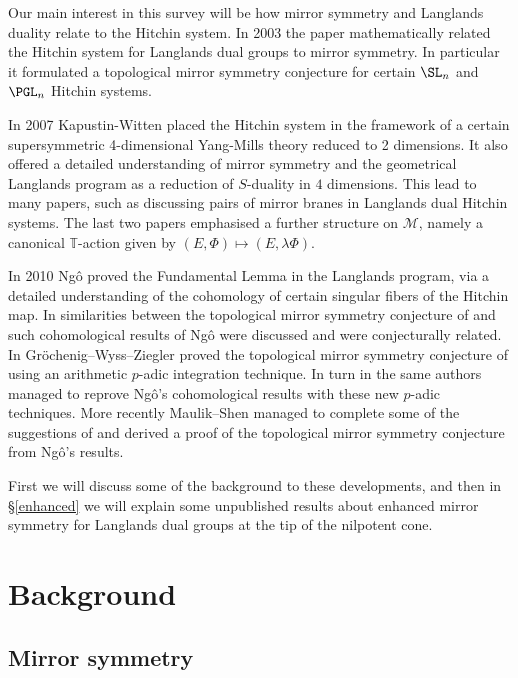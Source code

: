 \documentclass[12pt]{article}
\numberwithin{equation}{section}
\theoremstyle{remark}
\numberwithin{theorem}{section}
\def\M{{\mathcal{M}}}
\newcommand{\T}{{\mathbb{T}}}
\numberwithin{equation}{section}
\begin{document}
Our main interest in this survey will be  how mirror symmetry and Langlands duality relate to the Hitchin system. 
In 2003 the paper \cite{hausel-thaddeus} mathematically related the Hitchin system for Langlands dual groups to mirror symmetry. In particular it formulated a topological mirror symmetry conjecture for certain $\SL_n$ and $\PGL_n$ Hitchin systems. 

In 2007 Kapustin-Witten \cite{kapustin-witten} placed the Hitchin system in the framework of a certain supersymmetric 4-dimensional Yang-Mills theory reduced to  2 dimensions. It also offered a detailed understanding of mirror symmetry and the geometrical Langlands program as a reduction of $S$-duality in $4$ dimensions. 
This lead to many papers, such as \cite{baraglia-schaposnik, garcia-prada-etal, hitchin-characteristic,hausel-mellit-pei, hausel-hitchin} discussing pairs of mirror branes in Langlands dual Hitchin systems. The last two papers emphasised a further structure on $\M$, namely a canonical $\T$-action given by $(E,\Phi)\mapsto (E,\lambda\Phi)$. 

In 2010 Ng\^{o} \cite{ngo} proved  the Fundamental Lemma in the Langlands program, via a detailed understanding of the cohomology of certain singular fibers of the Hitchin map. In \cite{hausel-gths} similarities between the topological mirror symmetry conjecture of \cite{hausel-thaddeus} and such cohomological results of Ng\^{o} were discussed and were conjecturally related. 
In \cite{groechenig-etal1} Gr\"ochenig--Wyss--Ziegler proved the topological mirror symmetry conjecture of \cite{hausel-thaddeus} using an arithmetic $p$-adic integration technique. In turn in \cite{groechenig-etal2} the same authors managed to reprove  Ng\^{o}'s  cohomological results with these new $p$-adic techniques. More recently Maulik--Shen \cite{maulik-shen} managed to complete some of the suggestions of \cite{hausel-gths} and derived a proof of the topological mirror symmetry conjecture from Ng\^{o}'s results. 

First we will discuss some of the background to these developments, and then in \S \ref{enhanced} we will explain some unpublished results about enhanced mirror symmetry for Langlands dual groups at the tip of the nilpotent cone. 

\section{Background}
\subsection{Mirror symmetry}
\end{document}
